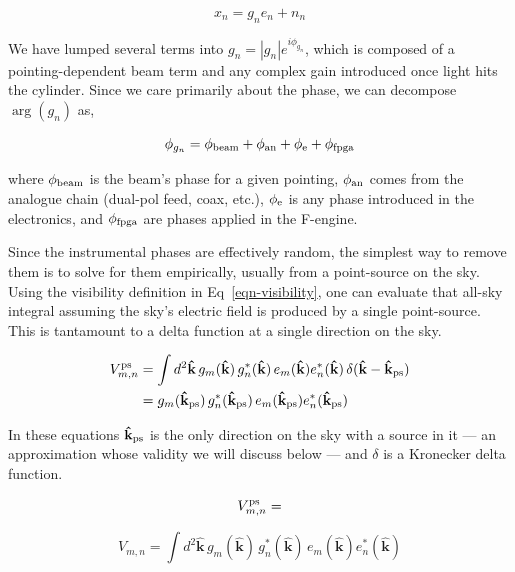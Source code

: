 \begin{equation}
     x_n = g_n e_n + n_n
\end{equation}

\noindent We have lumped several terms into $g_n = |g_n| e^{i \phi_{g_n}}$, 
which is composed of a pointing-dependent beam term
and any complex gain introduced once light hits the cylinder. 
Since we care primarily about the phase, we can decompose $\arg(g_n)$
as,

\begin{equation}
\phi_{g_n} = \phi_{\rm beam} + \phi_{\rm an} + \phi_{\rm e} + \phi_{\rm fpga} 
\end{equation}

\noindent where $\phi_{\rm beam}$ is the beam's phase for a given pointing, 
$\phi_{\rm an}$ comes from the analogue chain (dual-pol feed, coax, etc.),  
$\phi_{\rm e}$ is any phase introduced in the electronics, 
and $\phi_{\rm fpga}$ are phases applied in the F-engine. 

Since the instrumental phases are effectively random, the simplest 
way to remove them is to solve for them empirically, usually from 
a point-source on the sky. Using the visibility definition in 
Eq~\ref{eqn-visibility}, one can evaluate that all-sky integral 
assuming the sky's electric field is produced by a single point-source. 
This is tantamount to a delta function at a single direction on the sky.

\begin{align}
\label{eqn-vis_delta}
V^{\rm ps}_{m,n} &= \int d^2\mathbf{\hat{k}} \, g_m(\mathbf{\hat{k}}) \, g^*_n(\mathbf{\hat{k}})\, e_m(\mathbf{\hat{k}}) e_n^*(\mathbf{\hat{k}})\, \delta(\mathbf{\hat{k}} - \mathbf{\hat{k}}_{\rm ps})\\
 &= {g}_m(\mathbf{\hat{k}}_{\rm ps}) \, g^*_n(\mathbf{\hat{k}}_{\rm ps})\,e_m(\mathbf{\hat{k}}_{\rm ps}) e_n^*(\mathbf{\hat{k}}_{\rm ps})
\end{align}

\noindent In these equations $\mathbf{\hat{k}}_{\rm ps}$ is the only direction 
on the sky with a source in it --- an approximation whose validity we 
will discuss below --- and $\delta$ is a Kronecker delta function. 

\begin{equation}
V_{m, n}^{\rm ps} = 
\end{equation}

\begin{equation}
\label{eqn-visibility}
     V_{m,n} = \int d^2\mathbf{\hat{k}} \,
     g_m(\mathbf{\hat{k}}) \, g^*_n(\mathbf{\hat{k}})\, e_m(\mathbf{\hat{k}}) e_n^*(\mathbf{\hat{k}})
\end{equation}

